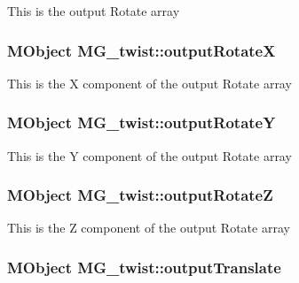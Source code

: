 This is the output Rotate array \hypertarget{class_m_g__twist_a20fee814720fcaee9b09f7de20f0b286}{
\subsubsection[{output\-Rotate\-X}]{\setlength{\rightskip}{0pt plus 5cm}M\-Object M\-G\-\_\-twist\-::output\-Rotate\-X\hspace{0.3cm}{\ttfamily [static]}}}\label{class_m_g__twist_a20fee814720fcaee9b09f7de20f0b286}
This is the X component of the output Rotate array \hypertarget{class_m_g__twist_a37e96db269a8af41fe9f808a35d27967}{
\subsubsection[{output\-Rotate\-Y}]{\setlength{\rightskip}{0pt plus 5cm}M\-Object M\-G\-\_\-twist\-::output\-Rotate\-Y\hspace{0.3cm}{\ttfamily [static]}}}\label{class_m_g__twist_a37e96db269a8af41fe9f808a35d27967}
This is the Y component of the output Rotate array \hypertarget{class_m_g__twist_a3cae9cd439fd68b38b77ae4e439f64d5}{
\subsubsection[{output\-Rotate\-Z}]{\setlength{\rightskip}{0pt plus 5cm}M\-Object M\-G\-\_\-twist\-::output\-Rotate\-Z\hspace{0.3cm}{\ttfamily [static]}}}\label{class_m_g__twist_a3cae9cd439fd68b38b77ae4e439f64d5}
This is the Z component of the output Rotate array \hypertarget{class_m_g__twist_a7e48847c5606a677f1dc1ea4bdb3402d}{
\subsubsection[{output\-Translate}]{\setlength{\rightskip}{0pt plus 5cm}M\-Object M\-G\-\_\-twist\-::output\-Translate\hspace{0.3cm}{\ttfamily [static]}}}\label{class_m_g__twist_a7e48847c5606a677f1dc1ea4bdb3402d}
